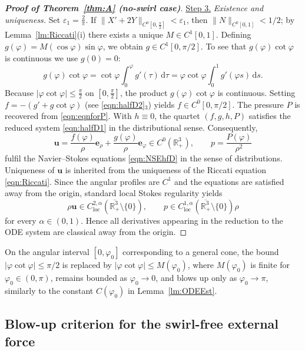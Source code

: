 \documentclass{amsart}
\newcommand{\n}{\rho}
\newcommand{\vp}{\varphi}
\newcommand{\Bu}{{\boldsymbol{u}}}
\newcommand{\Be}{{\boldsymbol{e}}}
\newcommand{\R}{\mathbb{R}}
\newcommand{\rmd}{\mathrm{d}}
\begin{document}
\begin{proof}[\textbf{Proof of Theorem~\ref{thm:A} (no-swirl case)}]
\noindent
\underline{Step 3.} \emph{Existence and uniqueness.}
Set $\varepsilon_1 = \frac{2}{\pi}$. If $\|X'+2Y\|_{C^0[0, \frac{\pi}{2}]} < \varepsilon_1$, then $\|N\|_{C^0[0, 1]} < 1/2$; by Lemma~\ref{lm:Riccati}(i) there exists a unique $M\in C^1[0,1]$. 
Defining $g(\vp)=M(\cos\vp)\sin\vp$, we obtain $g\in C^1[0,\pi/2]$.
To see that $g(\vp)\cot\vp$ is continuous we use $g(0)=0$:
\[
g(\vp)\cot\vp = \cot\vp \int_0^{\vp} g'(\tau)\,\rmd\tau
= \vp\cot\vp \int_0^1 g'(\vp s)\,\rmd s.
\]
Because $|\vp\cot\vp| \le \frac{\pi}{2}$ on $[0,\frac{\pi}{2}]$, the product $g(\varphi)\cot\varphi$ is continuous. Setting $f = -(g' + g\cot\varphi)$ (see \eqref{eqn:halfD2}$_3$) yields $f\in C^0[0,\pi/2]$.  The pressure $P$ is recovered from \eqref{eqn:eqnforP}.  With $h\equiv0$, the quartet $(f,g,h,P)$ satisfies the reduced system \eqref{eqn:halfD1} in the distributional sense. 
Consequently,
\[
\Bu = \frac{f(\varphi)}{\rho}\Be_\rho + \frac{g(\varphi)}{\rho}\Be_\varphi \in C^0(\R^3_+),
\qquad
p = \frac{P(\varphi)}{\rho^2}
\]
fulfil the Navier--Stokes equations \eqref{eqn:NSEhfD} in the sense of distributions.
Uniqueness of $\Bu$ is inherited from the uniqueness of the Riccati equation \eqref{eqn:Riccati}.
Since the angular profiles are $C^1$ and the equations are satisfied away from the origin, standard local Stokes regularity yields \[\n\Bu\in C^{2,\alpha}_{\mathrm{loc}}(\overline{\mathbb R^3_+}\setminus\{0\}),\qquad p\in C^{1,\alpha}_{\mathrm{loc}}(\overline{\mathbb R^3_+}\setminus\{0\})\n\] for every $\alpha\in(0,1)$. Hence all derivatives appearing in the reduction to the ODE system are classical away from the origin.
\end{proof}

On the angular interval $[0,\varphi_0]$ corresponding to a general cone,
the bound $|\varphi\cot\varphi|\le \pi/2$ is replaced by
$|\varphi\cot\varphi|\le M(\varphi_0)$, where $M(\varphi_0)$ is finite for $\varphi_0\in(0,\pi)$,
remains bounded as $\varphi_0\to0$, and blows up only as $\varphi_0\to\pi$, similarly to the constant
$C(\varphi_0)$ in Lemma~\ref{lm:ODEEst}.


\subsection{Blow-up criterion for the swirl-free external force}\label{sec:blowup}
\end{document}

